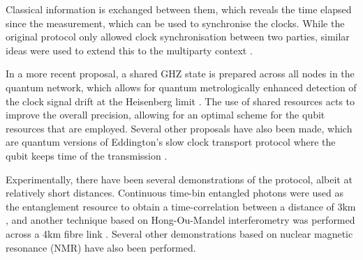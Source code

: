 Classical information is exchanged between them, which reveals the time elapsed since the measurement, which can be used to synchronise the clocks. While the original protocol only allowed clock synchronisation between two parties, similar ideas were used to extend this to the multiparty context \cite{bib:krvco2002quantum, bib:ben2011optimized, bib:ren2012clock}.

In a more recent proposal, a shared GHZ state is prepared across all nodes in the quantum network, which allows for quantum metrologically enhanced detection of the clock signal drift at the Heisenberg limit \cite{bib:komar14}. The use of shared resources acts to improve the overall precision, allowing for an optimal scheme for the qubit resources that are employed. Several other proposals have also been made, which are quantum versions of Eddington's slow clock transport protocol where the qubit keeps time of the transmission \cite{bib:chuang2000quantum, bib:tavakoli2015quantum}. 

Experimentally, there have been several demonstrations of the protocol, albeit at relatively short distances. Continuous time-bin entangled photons were used as the entanglement resource to obtain a time-correlation between a distance of 3km \cite{bib:valencia2004distant}, and another technique based on Hong-Ou-Mandel interferometry was performed across a 4km fibre link \cite{bib:quan2016demonstration}. Several other demonstrations based on nuclear magnetic resonance (NMR) \cite{bib:zhang2004nuclear, bib:kong2017implementation} have also been performed. 

